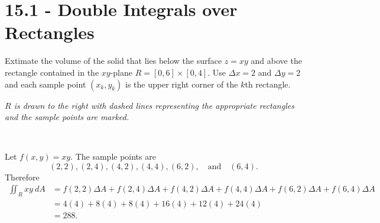 \documentclass[12pt]{exam}
\newcommand{\qdate}{15.1 - Double Integrals over Rectangles} %
\begin{document}
\section*{\qdate}


\begin{questions}

\question Extimate the volume of the solid that lies below the surface 
\(z=xy\) and above the rectangle contained in the \(xy\)-plane \(R=[0,6]\times[0,4]\). Use \(\Delta x=2\) and \(\Delta y=2\) and each sample point \((x_k,y_k)\) is the upper right corner of the $k$th rectangle.

\begin{minipage}[b]{.4\textwidth}

\emph{\(R\) is drawn to the right with dashed lines representing the appropriate rectangles and the sample points are marked.}

    \vspace{7.5cm}
    

\end{minipage}~
\begin{minipage}[t]{.5\textwidth}
\end{minipage}

\ifprintanswers
    \begin{solution}
        Let \(f(x,y)=xy\). The sample points are 
        \[
            (2,2),(2,4),(4,2),(4,4),(6,2),\quad \text{and}\quad (6,4).
        \]
        Therefore
        \begin{align*}
            \iint_{R} xy~dA & = f(2,2)\Delta A+f(2,4)\Delta A+f(4,2)\Delta A+f(4,4)\Delta A+f(6,2)\Delta A+f(6,4)\Delta A\\
                & = 4(4)+8(4)+8(4)+16(4)+12(4)+24(4)\\
                &=288.
        \end{align*}
    \end{solution}
\else
\fi


\end{questions}
\end{document}
